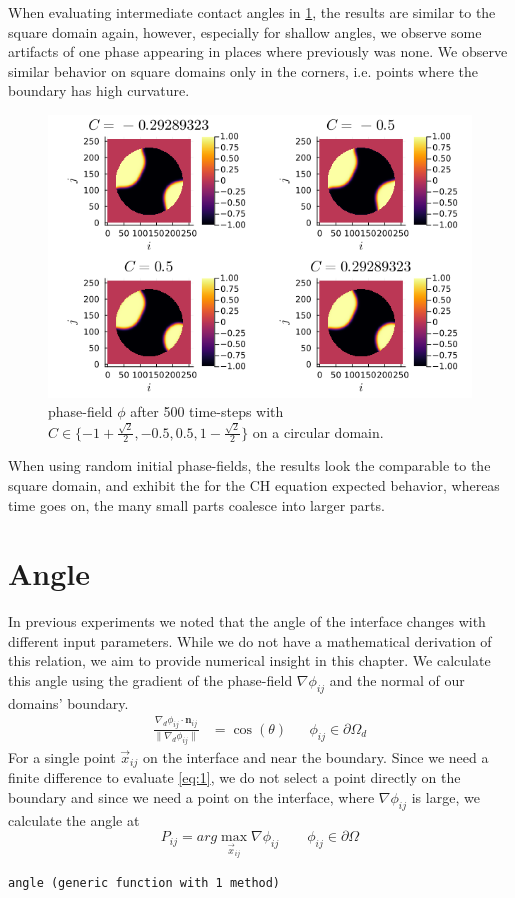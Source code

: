 \documentclass{mimosis}
\begin{document}
When evaluating intermediate contact angles in \ref{fig:angle-multiplec}, the results are similar to the square domain again, however, especially for shallow angles, we observe some artifacts of one phase appearing in places where previously was none. We observe similar behavior on square domains only in the corners, i.e. points where the boundary has high curvature.
\begin{figure}[htbp]
\centering
\includegraphics[width=.9\linewidth]{images/angle-multiplec.png}
\caption{\label{fig:angle-multiplec}phase-field \(\phi\) after 500 time-steps with \(C \in \{-1 + \frac{\sqrt{2}}{2} , -0.5 , 0.5 , 1 - \frac{\sqrt{2}}{2} \}\) on a circular domain.}
\end{figure}



When using random initial phase-fields, the results look the comparable to the square domain, and exhibit the for the CH equation expected behavior, whereas time goes on, the many small parts coalesce into larger parts.
\chapter{Angle}
\label{sec:org4c14e63}
In previous experiments we noted that the angle of the interface changes with different input parameters. While we do not have a mathematical derivation of this relation, we aim to provide numerical insight in this chapter. We calculate this angle using the gradient of the phase-field \(\nabla \phi_{ij}\) and the normal of our domains' boundary.
\begin{align}
\label{eq:1}
\frac{\nabla_d \phi_{ij} \cdot \mathbf{n}_{ij}}{\|\nabla_{d} \phi_{ij}\|} &= \cos(\theta)& & \phi_{ij} \in \partial\Omega_{d}
\end{align}
For a single point \(\vec{x}_{ij}\) on the interface and near the boundary. Since we need a finite difference to evaluate \ref{eq:1}, we do not select a point directly on the boundary and since we need a point on the interface, where \(\nabla \phi_{ij}\) is large, we calculate the angle at
\begin{equation}
\label{eq:2}
P_{ij} = arg\max_{\vec{x}_{ij}} \nabla \phi_{ij} \qquad \phi_{ij} \in \partial \Omega
\end{equation}
\label{angle-function}
\begin{verbatim}
angle (generic function with 1 method)
\end{verbatim}
\end{document}
